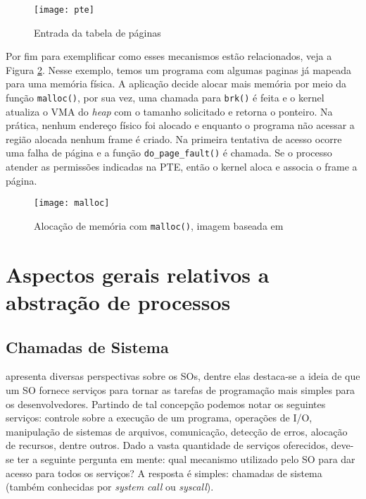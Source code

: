 \begin{figure}[!h]
  \centering
  \texttt{[image: pte]}
  \caption{Entrada da tabela de páginas}
  \label{fig:pte}
\end{figure}

Por fim para exemplificar como esses mecanismos estão relacionados, veja a
Figura \ref{fig:malloc_linux}. Nesse exemplo, temos um programa com algumas
paginas já mapeada para uma memória física. A aplicação decide alocar mais
memória por meio da função \texttt{malloc()}, por sua vez, uma chamada para
\texttt{brk()} é feita e o kernel atualiza o VMA do \textit{heap} com o tamanho
solicitado e retorna o ponteiro. Na prática, nenhum endereço físico foi alocado
e enquanto o programa não acessar a região alocada nenhum frame é criado. Na
primeira tentativa de acesso ocorre uma falha de página e a função
\texttt{do\_page\_fault()} é chamada. Se o processo atender as permissões
indicadas na PTE, então o kernel aloca e associa o frame a página.

\begin{figure}[!h]
  \centering
  \texttt{[image: malloc]}
  \caption{Alocação de memória com \texttt{malloc()}, imagem baseada em \citep{anatomy_program_mem}}
  \label{fig:malloc_linux}
\end{figure}

\section{Aspectos gerais relativos a abstração de processos}

\subsection{Chamadas de Sistema}

\cite{silberschatz} apresenta diversas perspectivas sobre os SOs, dentre elas
destaca-se a ideia de que um SO fornece serviços para tornar as tarefas de
programação mais simples para os desenvolvedores. Partindo de tal concepção
podemos notar os seguintes serviços: controle sobre a execução de um programa,
operações de I/O, manipulação de sistemas de arquivos, comunicação, detecção de
erros, alocação de recursos, dentre outros. Dado a vasta quantidade de serviços
oferecidos, deve-se ter a seguinte pergunta em mente: qual mecanismo utilizado
pelo SO para dar acesso para todos os serviços? A resposta é simples: chamadas
de sistema (também conhecidas por \emph{system call} ou \emph{syscall}).

